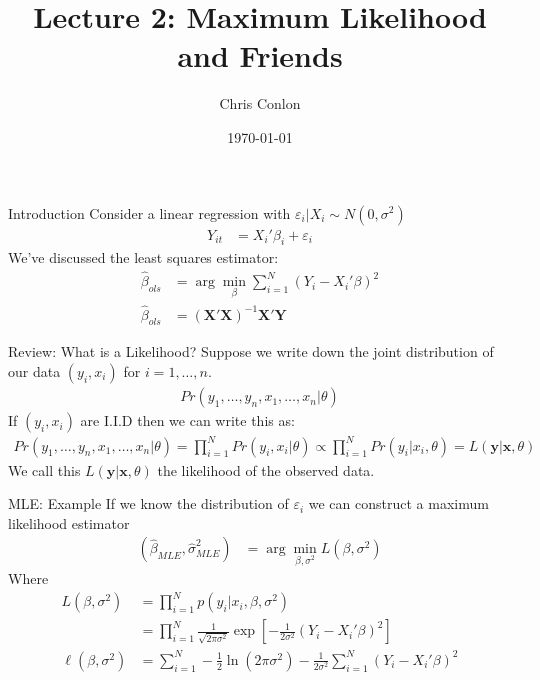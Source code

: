 \documentclass[aspectratio=169]{beamer}
\title{Lecture 2: Maximum Likelihood and Friends}
\author{Chris Conlon }
\institute{NYU Stern }
\date{\today}
\begin{document}
\maketitle

\begin{frame}{Introduction}
Consider a linear regression with $\varepsilon_i | X_i \sim N(0,\sigma^2)$
\begin{align*}
Y_{it} &= X_{i}'\beta_i + \varepsilon_{i}
\end{align*}
We've discussed the \alert{least squares estimator}:
\begin{align*}
\widehat{\beta}_{ols} &= \arg \min_{\beta} \sum_{i=1}^N (Y_i - X_i' \beta)^2\\
\widehat{\beta}_{ols} &= (\mathbf{X}'\mathbf{X})^{-1} \mathbf{X}' \mathbf{Y}
\end{align*}
\end{frame}


\begin{frame}{Review: What is a Likelihood?}
Suppose we write down the joint distribution of our data $(y_i,x_i)$ for $i=1,\ldots,n$.
\begin{align*}
Pr(y_1,\ldots,y_n, x_1,\ldots,x_n | \theta)
\end{align*}
If  $(y_i,x_i)$ are I.I.D then we can write this as:
\begin{align*}
 Pr(y_1,\ldots,y_n, x_1,\ldots,x_n | \theta) = \prod_{i=1}^N Pr(y_i, x_i | \theta) \propto \prod_{i=1}^N Pr(y_i | x_i , \theta)=L( \mathbf{y}| \mathbf{x} ,\theta )
\end{align*}
We call this $L( \mathbf{y}| \mathbf{x} ,\theta )$ the \alert{likelihood} of the observed data.
\end{frame}




\begin{frame}{MLE: Example}
If we know the distribution of $\varepsilon_i$ we can construct a \alert{maximum likelihood estimator}
\begin{align*}
(\widehat{\beta}_{MLE},\widehat{\sigma}^2_{MLE}) &= \arg \min_{\beta,\sigma^2} L(\beta,\sigma^2)
\end{align*}
Where 
\begin{align*} 
L(\beta,\sigma^2) &= \prod_{i=1}^N p(y_i | x_i,\beta,\sigma^2) \\
                  &= \prod_{i=1}^N \frac{1}{\sqrt{2 \pi \sigma^2}} \exp \left[-\frac{1}{2\sigma^2}(Y_i - X_i' \beta)^2 \right]\\
\ell(\beta,\sigma^2) &= \sum_{i=1}^N -\frac{1}{2} \ln (2 \pi \sigma^2) - \frac{1}{2 \sigma^2} \sum_{i=1}^N(Y_i - X_i' \beta)^2
\end{align*}
\end{frame}
\end{document}
